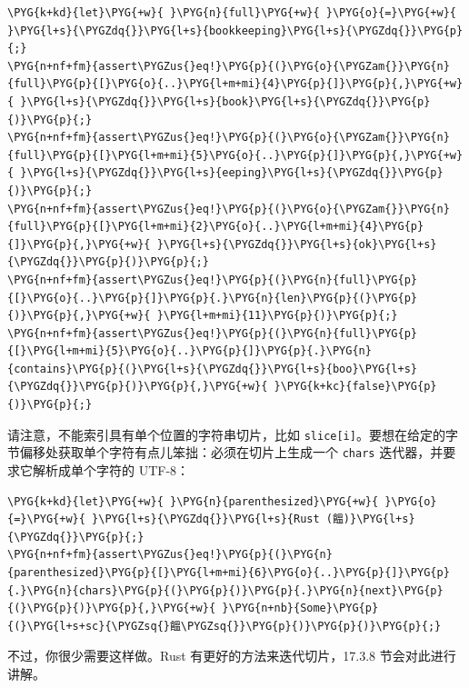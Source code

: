 \begin{Verbatim}[commandchars=\\\{\},breaklines=true,breakanywhere=true,fontsize=\codefont,xleftmargin=17bp]
\PYG{k+kd}{let}\PYG{+w}{ }\PYG{n}{full}\PYG{+w}{ }\PYG{o}{=}\PYG{+w}{ }\PYG{l+s}{\PYGZdq{}}\PYG{l+s}{bookkeeping}\PYG{l+s}{\PYGZdq{}}\PYG{p}{;}
\PYG{n+nf+fm}{assert\PYGZus{}eq!}\PYG{p}{(}\PYG{o}{\PYGZam{}}\PYG{n}{full}\PYG{p}{[}\PYG{o}{..}\PYG{l+m+mi}{4}\PYG{p}{]}\PYG{p}{,}\PYG{+w}{ }\PYG{l+s}{\PYGZdq{}}\PYG{l+s}{book}\PYG{l+s}{\PYGZdq{}}\PYG{p}{)}\PYG{p}{;}
\PYG{n+nf+fm}{assert\PYGZus{}eq!}\PYG{p}{(}\PYG{o}{\PYGZam{}}\PYG{n}{full}\PYG{p}{[}\PYG{l+m+mi}{5}\PYG{o}{..}\PYG{p}{]}\PYG{p}{,}\PYG{+w}{ }\PYG{l+s}{\PYGZdq{}}\PYG{l+s}{eeping}\PYG{l+s}{\PYGZdq{}}\PYG{p}{)}\PYG{p}{;}
\PYG{n+nf+fm}{assert\PYGZus{}eq!}\PYG{p}{(}\PYG{o}{\PYGZam{}}\PYG{n}{full}\PYG{p}{[}\PYG{l+m+mi}{2}\PYG{o}{..}\PYG{l+m+mi}{4}\PYG{p}{]}\PYG{p}{,}\PYG{+w}{ }\PYG{l+s}{\PYGZdq{}}\PYG{l+s}{ok}\PYG{l+s}{\PYGZdq{}}\PYG{p}{)}\PYG{p}{;}
\PYG{n+nf+fm}{assert\PYGZus{}eq!}\PYG{p}{(}\PYG{n}{full}\PYG{p}{[}\PYG{o}{..}\PYG{p}{]}\PYG{p}{.}\PYG{n}{len}\PYG{p}{(}\PYG{p}{)}\PYG{p}{,}\PYG{+w}{ }\PYG{l+m+mi}{11}\PYG{p}{)}\PYG{p}{;}
\PYG{n+nf+fm}{assert\PYGZus{}eq!}\PYG{p}{(}\PYG{n}{full}\PYG{p}{[}\PYG{l+m+mi}{5}\PYG{o}{..}\PYG{p}{]}\PYG{p}{.}\PYG{n}{contains}\PYG{p}{(}\PYG{l+s}{\PYGZdq{}}\PYG{l+s}{boo}\PYG{l+s}{\PYGZdq{}}\PYG{p}{)}\PYG{p}{,}\PYG{+w}{ }\PYG{k+kc}{false}\PYG{p}{)}\PYG{p}{;}
\end{Verbatim}

请注意，不能索引具有单个位置的字符串切片，比如 \texttt{slice[i]}。要想在给定的字节偏移处获取单个字符有点儿笨拙：必须在切片上生成一个 \texttt{chars} 迭代器，并要求它解析成单个字符的 UTF-8：

\begin{Verbatim}[commandchars=\\\{\},breaklines=true,breakanywhere=true,fontsize=\codefont,xleftmargin=17bp]
\PYG{k+kd}{let}\PYG{+w}{ }\PYG{n}{parenthesized}\PYG{+w}{ }\PYG{o}{=}\PYG{+w}{ }\PYG{l+s}{\PYGZdq{}}\PYG{l+s}{Rust (饂)}\PYG{l+s}{\PYGZdq{}}\PYG{p}{;}
\PYG{n+nf+fm}{assert\PYGZus{}eq!}\PYG{p}{(}\PYG{n}{parenthesized}\PYG{p}{[}\PYG{l+m+mi}{6}\PYG{o}{..}\PYG{p}{]}\PYG{p}{.}\PYG{n}{chars}\PYG{p}{(}\PYG{p}{)}\PYG{p}{.}\PYG{n}{next}\PYG{p}{(}\PYG{p}{)}\PYG{p}{,}\PYG{+w}{ }\PYG{n+nb}{Some}\PYG{p}{(}\PYG{l+s+sc}{\PYGZsq{}饂\PYGZsq{}}\PYG{p}{)}\PYG{p}{)}\PYG{p}{;}
\end{Verbatim}

不过，你很少需要这样做。Rust 有更好的方法来迭代切片，17.3.8 节会对此进行讲解。

